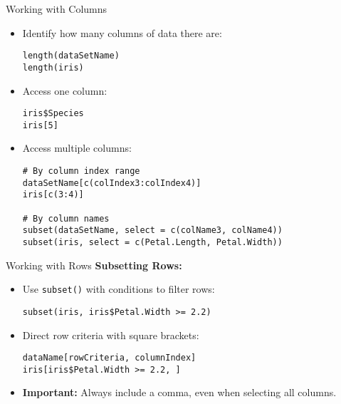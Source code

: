 \documentclass{beamer}
\begin{document}
\begin{frame}[fragile]{Working with Columns}
\begin{itemize}
    \item Identify how many columns of data there are:
    \begin{verbatim}
length(dataSetName)
length(iris)
    \end{verbatim}

    \item Access one column:
    \begin{verbatim}
iris$Species
iris[5]
    \end{verbatim}

    \item Access multiple columns:
    \begin{verbatim}
# By column index range
dataSetName[c(colIndex3:colIndex4)]
iris[c(3:4)]

# By column names
subset(dataSetName, select = c(colName3, colName4))
subset(iris, select = c(Petal.Length, Petal.Width))
    \end{verbatim}
\end{itemize}
\end{frame}

\begin{frame}[fragile]{Working with Rows}
\textbf{Subsetting Rows:}
\begin{itemize}
    \item Use \texttt{subset()} with conditions to filter rows:
    \begin{verbatim}
subset(iris, iris$Petal.Width >= 2.2)
    \end{verbatim}

    \item Direct row criteria with square brackets:
    \begin{verbatim}
dataName[rowCriteria, columnIndex]
iris[iris$Petal.Width >= 2.2, ]
    \end{verbatim}

    \item \textbf{Important:} Always include a comma, even when selecting all columns.
\end{itemize}
\end{frame}
\end{document}
